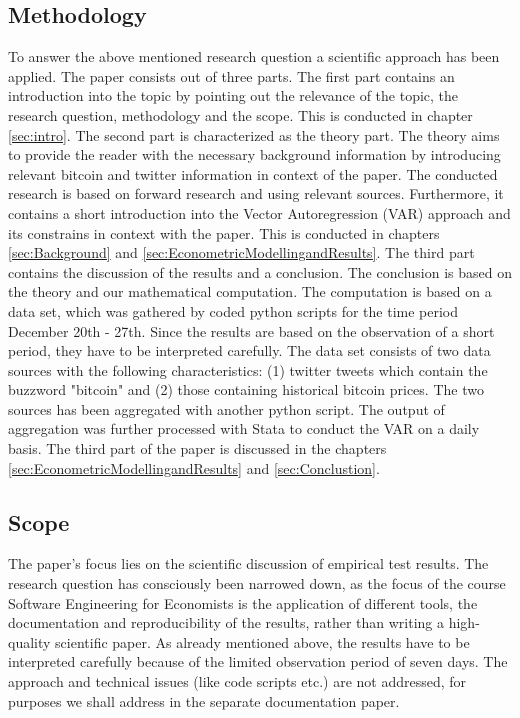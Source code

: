 \documentclass[a4paper,american,12pt]{article}
\begin{document}
\begin{spacing}{1.2}
\subsection{Methodology}
\label{sec:Methodology}
To answer the above mentioned research question a scientific approach has been applied. The paper consists out of three parts. The first part contains an introduction into the topic by pointing out the relevance of the topic, the research question, methodology and the scope. This is conducted in chapter \ref{sec:intro}. The second part is characterized as the theory part. The theory aims to provide the reader with the necessary background information by introducing relevant bitcoin and twitter information in context of the paper. The conducted research is based on forward research and using relevant sources. Furthermore, it contains a short introduction into the Vector Autoregression (VAR) approach and its constrains in context with the paper. This is conducted in chapters \ref{sec:Background} and \ref{sec:EconometricModellingandResults}. The third part contains the discussion of the results and a conclusion. The conclusion is based on the theory and our mathematical computation. The computation is based on a data set, which was gathered by coded python scripts for the time period December 20th - 27th. Since the results are based on the observation of a short period, they have to be interpreted carefully. The data set consists of two data sources with the following characteristics: (1) twitter tweets which contain the buzzword "bitcoin" and (2) those containing historical bitcoin prices. The two sources has been aggregated with another python script. The output of aggregation was further processed with Stata to conduct the VAR on a daily basis. The third part of the paper is discussed in the chapters \ref{sec:EconometricModellingandResults} and \ref{sec:Conclustion}.

\subsection{Scope}
\label{sec:Scope}
The paper's focus lies on the scientific discussion of empirical test results. The research question has consciously been narrowed down, as the focus of the course Software Engineering for Economists is the application of different tools, the documentation and reproducibility of the results, rather than writing a high-quality scientific paper. As already mentioned above, the results have to be interpreted carefully because of the limited observation period of seven days. The approach and technical issues (like code scripts etc.) are not addressed, for purposes we shall address in the separate documentation paper.


\end{spacing}
\end{document}
